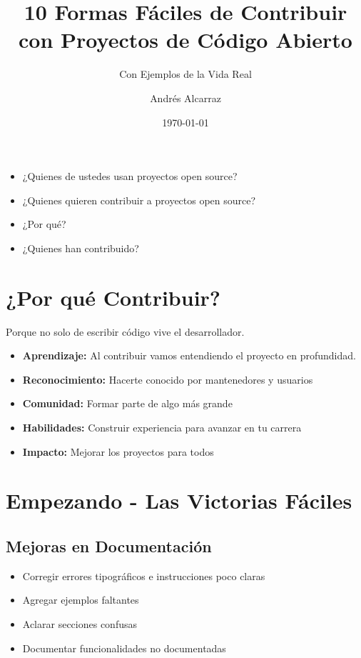\documentclass{presentacion}
\title[Contribuir en Open Source] 
{10 Formas Fáciles de Contribuir con Proyectos de Código Abierto}
\subtitle{Con Ejemplos de la Vida Real}
\author{Andrés Alcarraz}
\date{\today}
\begin{document}
\frame{\titlepage}
\begin{frame}
 \begin{itemize} [<+->]
  \item ¿Quienes de ustedes usan proyectos open source?
  \item ¿Quienes quieren contribuir a proyectos open source? 
  \item ¿Por qué?
  \item ¿Quienes han contribuido?
 \end{itemize}

\end{frame}

\section{¿Por qué Contribuir?}
\begin{frame}
    Porque no solo de escribir código vive el desarrollador.
    \pause
    \begin{itemize}[<+->]
        \item \textbf{Aprendizaje:} Al contribuir vamos entendiendo el proyecto en profundidad.
        \item \textbf{Reconocimiento:} Hacerte conocido por mantenedores y usuarios
        \item \textbf{Comunidad:} Formar parte de algo más grande
        \item \textbf{Habilidades:} Construir experiencia para avanzar en tu carrera
        \item \textbf{Impacto:} Mejorar los proyectos para todos
    \end{itemize}
    \vspace{1em}
\end{frame}

\section{Empezando - Las Victorias Fáciles}

\subsection{Mejoras en Documentación}
\begin{frame}
    \begin{itemize}[<+->]
        \item Corregir errores tipográficos e instrucciones poco claras
        \item Agregar ejemplos faltantes
        \item Aclarar secciones confusas
        \item Documentar funcionalidades no documentadas
    \end{itemize}
    
    \vspace{1em}
\end{frame}
\end{document}
